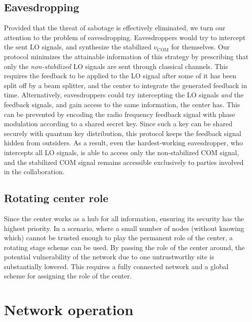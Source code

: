 \subsection{Eavesdropping}
Provided that the threat of sabotage is effectively eliminated, we turn our
attention to the problem of eavesdropping. Eavesdroppers would try to intercept
the sent LO signals, and synthesize the stabilized $\nu_\mathrm{COM}$ for themselves. Our
protocol minimizes the attainable information of this strategy by prescribing
that only the \emph{non-stabilized} LO signals are sent through classical
channels. This requires the feedback to be applied to the LO signal after some
of it has been split off by a beam splitter, and the center to integrate the
generated feedback in time. Alternatively, eavesdroppers could try intercepting
the LO signals \emph{and} the feedback signals, and gain access to the same
information, the center has. This can be prevented by encoding the radio
frequency feedback signal with phase modulation according to a shared secret
key. Since such a key can be shared securely with quantum key distribution, this protocol keeps the feedback signal hidden from outsiders. As a
result, even the hardest-working eavesdropper, who intercepts all LO signals, is
able to access only the non-stabilized COM signal, and the stabilized COM signal
remains accessible exclusively to parties involved in the collaboration.

\subsection{Rotating center role}
Since the center works as  a hub for all information, ensuring
its security has the highest priority. In a scenario,  where 
a small number of nodes (without knowing which) cannot be 
trusted enough to play the permanent role of the center, a rotating stage
scheme can be used. By passing the role of the center around, the
potential vulnerability of the network due to one untrustworthy site is
substantially lowered. This requires a fully connected
network and a global scheme for assigning the role of the center.


\section{Network operation}
\label{app:Network_operation}

